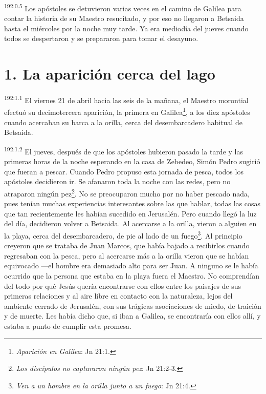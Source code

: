 \par
\textsuperscript{192:0.5} Los apóstoles se detuvieron varias veces en el camino de Galilea para contar la historia de su Maestro resucitado, y por eso no llegaron a Betsaida hasta el miércoles por la noche muy tarde. Ya era mediodía del jueves cuando todos se despertaron y se prepararon para tomar el desayuno.

\section*{1. La aparición cerca del lago}
\par
\textsuperscript{192:1.1} El viernes 21 de abril hacia las seis de la mañana, el Maestro morontial efectuó su decimotercera aparición, la primera en Galilea\footnote{\textit{Aparición en Galilea}: Jn 21:1.}, a los diez apóstoles cuando acercaban su barca a la orilla, cerca del desembarcadero habitual de Betsaida.

\par
\textsuperscript{192:1.2} El jueves, después de que los apóstoles hubieron pasado la tarde y las primeras horas de la noche esperando en la casa de Zebedeo, Simón Pedro sugirió que fueran a pescar. Cuando Pedro propuso esta jornada de pesca, todos los apóstoles decidieron ir. Se afanaron toda la noche con las redes, pero no atraparon ningún pez\footnote{\textit{Los discípulos no capturaron ningún pez}: Jn 21:2-3.}. No se preocuparon mucho por no haber pescado nada, pues tenían muchas experiencias interesantes sobre las que hablar, todas las cosas que tan recientemente les habían sucedido en Jerusalén. Pero cuando llegó la luz del día, decidieron volver a Betsaida. Al acercarse a la orilla, vieron a alguien en la playa, cerca del desembarcadero, de pie al lado de un fuego\footnote{\textit{Ven a un hombre en la orilla junto a un fuego}: Jn 21:4.}. Al principio creyeron que se trataba de Juan Marcos, que había bajado a recibirlos cuando regresaban con la pesca, pero al acercarse más a la orilla vieron que se habían equivocado ---el hombre era demasiado alto para ser Juan. A ninguno se le había ocurrido que la persona que estaba en la playa fuera el Maestro. No comprendían del todo por qué Jesús quería encontrarse con ellos entre los paisajes de sus primeras relaciones y al aire libre en contacto con la naturaleza, lejos del ambiente cerrado de Jerusalén, con sus trágicas asociaciones de miedo, de traición y de muerte. Les había dicho que, si iban a Galilea, se encontraría con ellos allí, y estaba a punto de cumplir esta promesa.

